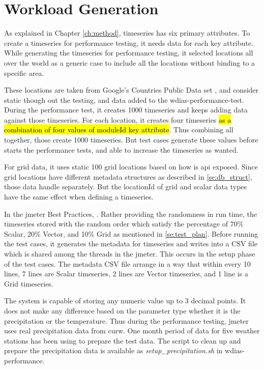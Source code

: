 \section{Workload Generation}
\label{se:workload}

As explained in Chapter \ref{ch:method}, timeseries has six primary attributes. To create a timeseries for performance testing, it needs data for each key attribute.
While generating the timeseries for performance testing, it selected locations all over the world as a generic case to include all the locations without binding to a specific area.

These locations are taken from Google's Countries Public Data set \cite{GoogleGoogleCounties}, and consider static though out the testing, and data added to the wdias-performance-test.
During the performance test, it creates 1000 timeseries and keeps adding data against those timeseries. For each location, it creates four timeseries \hl{as a combination of four values of moduleId key attribute}. Thus combining all together, those create 1000 timeseries. But test cases generate these values before starts the performance tests, and able to increase the timeseries as wanted.

For grid data, it uses static 100 grid locations based on how is \acrshort{api} exposed. Since grid locations have different metadata structures as described in \cref{se:db_struct}, those data handle separately. But the locationId of grid and scalar data types have the same effect when defining a timeseries.

In the \acrshort{jmeter} Best Practices, . Rather providing the randomness in run time, the timeseries stored with the random order which satisfy the percentage of 70\% Scalar, 20\% Vector, and 10\% Grid as mentioned in \cref{se:test_plan}.
Before running the test cases, it generates the metadata for timeseries and writes into a CSV file which is shared among the threads in the \acrshort{jmeter}. This occurs in the setup phase of the test cases. The metadata CSV file arrange in a way that within every 10 lines, 7 lines are Scalar timeseries, 2 lines are Vector timeseries, and 1 line is a Grid timeseries.

The system is capable of storing any numeric value up to 3 decimal points. It does not make any difference based on the parameter type whether it is the precipitation or the temperature. Thus during the performance testing, \acrshort{jmeter} uses real precipitation data from \acrshort{curw}. One month period of data for five weather stations has been using to prepare the test data. The script to clean up and prepare the precipitation data is available as \emph{setup\_precipitation.sh} in wdias-performance.

